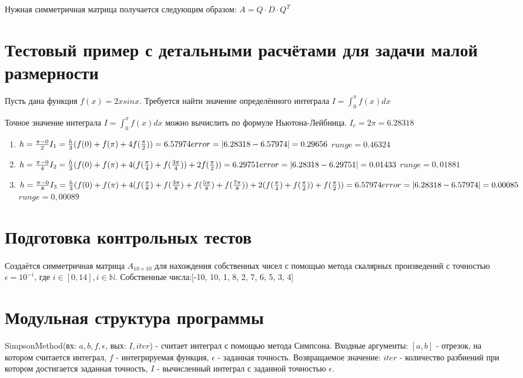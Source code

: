 \documentclass{article}
\begin{document}
	Нужная симметричная матрица получается следующим образом:
	$A = Q \cdot D \cdot Q^T$
	
	\section{Тестовый пример с детальными расчётами для задачи малой размерности}
	Пусть дана функция $f(x) = 2xsinx$. Требуется найти значение определённого интеграла $I = \int_0^\pi f(x)dx$ 
	
	Точное значение интеграла $I = \int_0^\pi f(x)dx$ можно вычислить по формуле Ньютона-Лейбница. $I_e = 2\pi = 6.28318$
	
	\begin{enumerate}
		\item $h = \frac{\pi - 0}{2}\\
		I_1 = \frac{h}{3}(f(0)+f(\pi)+4f(\frac{\pi}{2})) = 6.57974\\
		error = |6.28318 - 6.57974| = 0.29656$ $runge = 0.46324$
		\item $h = \frac{\pi - 0}{4}\\
		I_2 = \frac{h}{3}(f(0)+f(\pi)+4(f(\frac{\pi}{4}) + f(\frac{3\pi}{4}))+ 2f(\frac{\pi}{2})) = 6.29751\\
		error = |6.28318 - 6.29751| =  0.01433$ $runge = 0,01881$
		\item $h = \frac{\pi - 0}{8}\\
		I_3 = \frac{h}{3}(f(0)+f(\pi)+4(f(\frac{\pi}{8}) + f(\frac{3\pi}{8}) + f(\frac{5\pi}{8}) + f(\frac{7\pi}{8}))+ 2(f(\frac{\pi}{4})+ f(\frac{\pi}{2})) + f(\frac{\pi}{2})) = 6.57974\\
		error = |6.28318 - 6.57974| =  0.00085$ $runge = 0,00089$
	\end{enumerate}
	
	\section{Подготовка контрольных тестов}
	\paragraph{}Создаётся симметричная матрица  $A_{10 \times 10}$  для нахождения собственных чисел с помощью метода скалярных произведений с точностью  $\epsilon=10^{-i}$, где  $i \in [0, 14], i \in \mathbb {N} $. 
	Собственные числа:[-10, 10, 1, 8, 2, 7, 6, 5, 3, 4]
	
	\section{Модульная структура программы}
	SimpsonMethod(вх: $a, b, f, \epsilon$, вых: $I, iter$) - считает интеграл с помощью метода Симпсона. Входные аргументы: $[a,b]$ - отрезок, на котором считается интеграл, $f$ - интегрируемая функция, $\epsilon$ - заданная точность. Возвращаемое значение: $iter$ - количество разбиений при котором достигается
	заданная точность, $I$ - вычисленный интеграл с заданной точностью $\epsilon$.
	
\end{document}
